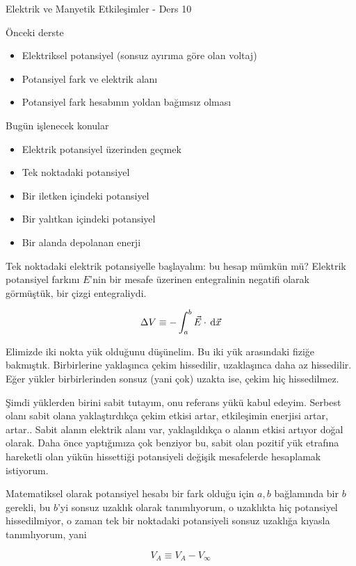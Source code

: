 \documentclass[12pt,fleqn]{article}\usepackage{../../common}
\begin{document}
Elektrik ve Manyetik Etkileşimler - Ders 10

Önceki derste

\begin{itemize}
   \item Elektriksel potansiyel (sonsuz ayırıma göre olan voltaj)
   \item Potansiyel fark ve elektrik alanı
   \item Potansiyel fark hesabının yoldan bağımsız olması
\end{itemize}

Bugün işlenecek konular

\begin{itemize}
   \item Elektrik potansiyel üzerinden geçmek
   \item Tek noktadaki potansiyel
   \item Bir iletken içindeki potansiyel
   \item Bir yalıtkan içindeki potansiyel
   \item Bir alanda depolanan enerji
\end{itemize}

Tek noktadaki elektrik potansiyelle başlayalım: bu hesap mümkün mü? Elektrik
potansiyel farkını $E$'nin bir mesafe üzerinen entegralinin negatifi olarak
görmüştük, bir çizgi entegraliydi.

$$
\Delta V \equiv -\int_{a}^{b} \vec{E} \cdot \,\mathrm{d} \vec{x}
$$

Elimizde iki nokta yük olduğunu düşünelim. Bu iki yük arasındaki fiziğe
bakmıştık. Birbirlerine yaklaşınca çekim hissedilir, uzaklaşınca daha az
hissedilir. Eğer yükler birbirlerinden sonsuz (yani çok) uzakta ise, çekim hiç
hissedilmez.

Şimdi yüklerden birini sabit tutayım, onu referans yükü kabul edeyim. Serbest
olanı sabit olana yaklaştırdıkça çekim etkisi artar, etkileşimin enerjisi artar,
artar.. Sabit alanın elektrik alanı var, yaklaşıldıkça o alanın etkisi artıyor
doğal olarak. Daha önce yaptığımıza çok benziyor bu, sabit olan pozitif yük
etrafına hareketli olan yükün hissettiği potansiyeli değişik mesafelerde
hesaplamak istiyorum.

Matematiksel olarak potansiyel hesabı bir fark olduğu için $a,b$ bağlamında bir
$b$ gerekli, bu $b$'yi sonsuz uzaklık olarak tanımlıyorum, o uzaklıkta hiç
potansiyel hissedilmiyor, o zaman tek bir noktadaki potansiyeli sonsuz uzaklığa
kıyasla tanımlıyorum, yani

$$
V_A \equiv V_A - V_\infty
$$
\end{document}
